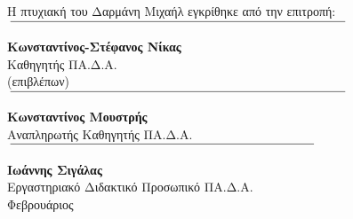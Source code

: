 {\cleardoublepage
\setsinglecolumn
\thispagestyle{empty}

\null\vfill
\begin{center}
  Η πτυχιακή του Δαρμάνη Μιχαήλ εγκρίθηκε από την επιτροπή: \\

  \vspace{.25in} \vspace{.75in}
  $\:\overline{~~~~ \mbox{\rule{0in}{0.16in} \hspace{3.5in}}}\:$ \\
  \textbf{Κωνσταντίνος-Στέφανος Νίκας} \\
  Καθηγητής ΠΑ.Δ.Α. \\
  (επιβλέπων) \\

  \vspace{.75in}
  $\:\overline{~~~~ \mbox{\rule{0in}{0.16in} \hspace{3.5in}}}\:$ \\
  \textbf{Κωνσταντίνος Μουστρής} \\
  Αναπληρωτής Καθηγητής ΠΑ.Δ.Α. \\

  \vspace{.75in}
  $\:\overline{~~~~ \mbox{\rule{0in}{0.16in} \hspace{3.15in}}}\:$ \\
  \vspace{.3pt} \textbf{Ιωάννης Σιγάλας} \\
  Εργαστηριακό Διδακτικό Προσωπικό ΠΑ.Δ.Α. \\
  \vspace{.75in}
  \vspace{-.25in}
  \vspace{.75in}
  Φεβρουάριος\space\the\year
\end{center}
\vfill\null}